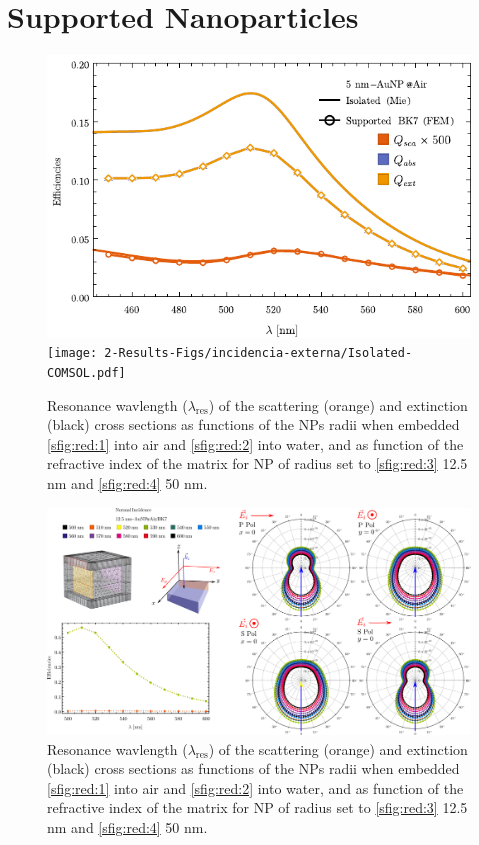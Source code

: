 
\section{Supported Nanoparticles}


\begin{figure}\centering
\includegraphics[width = .55\textwidth ]{2-Results-Figs/incidencia-externa/Supported-FEM.pdf}%
\texttt{[image: 2-Results-Figs/incidencia-externa/Isolated-COMSOL.pdf]}%
\caption[Convergence tests: The Meshing]{Resonance wavlength ($\lambda_\text{res}$) of the scattering (orange) and extinction (black) cross sections as functions of the NPs radii when embedded  \ref{sfig:red:1} into air and \ref{sfig:red:2} into water, and as function of the refractive index of the matrix for NP of radius set to  \ref{sfig:red:3} 12.5 nm and \ref{sfig:red:4} 50 nm.}
\end{figure}




\begin{figure}\centering
\includegraphics[width = .9\textwidth ]{2-Results-Figs/incidencia-iterna/normal_internal.png}%
\caption[Convergence tests: The Meshing]{Resonance wavlength ($\lambda_\text{res}$) of the scattering (orange) and extinction (black) cross sections as functions of the NPs radii when embedded  \ref{sfig:red:1} into air and \ref{sfig:red:2} into water, and as function of the refractive index of the matrix for NP of radius set to  \ref{sfig:red:3} 12.5 nm and \ref{sfig:red:4} 50 nm.}
\end{figure}




